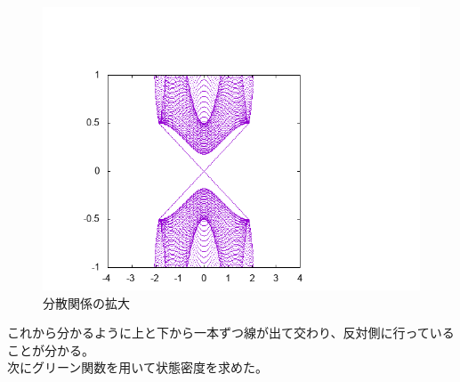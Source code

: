 \documentclass{jarticle}
\begin{document}
\begin{figure}[H]
	\centering
	\includegraphics[scale=0.7]{../../20/KS/20-2/graph/data.png}
	\caption{分散関係の拡大}
\end{figure}
これから分かるように上と下から一本ずつ線が出て交わり、反対側に行っていることが分かる。\\
次にグリーン関数を用いて状態密度を求めた。
\end{document}
